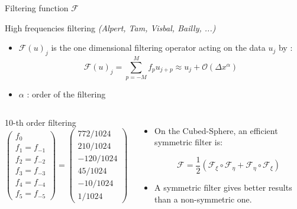 \documentclass[11pt]{beamer}
\begin{document}
\begin{frame}{Filtering function $\mathcal{F}$ }
\begin{block}{High frequencies filtering \textit{(Alpert, Tam, Visbal, Bailly, ...)}}
\begin{itemize}
\item $\mathcal{F}(u)_j$ is the one dimensional filtering operator acting on the data $u_j$ by :
$$
\mathcal{F}(u)_j = \sum_{p=-M}^M f_{p} u_{j+p}\approx u_j + \mathcal{O}\left( \Delta x^{\alpha} \right)
$$
\item $\alpha$ : order of the filtering
\end{itemize}
\end{block}
\begin{columns}
\begin{block}{10-th order filtering}
$\begin{pmatrix}
f_0\\ f_1 = f_{-1}\\ f_2 = f_{-2} \\ f_3=f_{-3} \\ f_4=f_{-4} \\ f_5 = f_{-5}
\end{pmatrix}=\begin{pmatrix}
772/1024\\ 210/1024\\ -120/1024\\ 45/1024\\ -10/1024\\ 1/1024
\end{pmatrix}$
\end{block}

\begin{itemize}
\item On the Cubed-Sphere, an efficient symmetric filter is:
\begin{block}{}
\begin{equation*}
\mathcal{F} = \dfrac{1}{2} \left( \mathcal{F}_{\xi} \circ \mathcal{F}_{\eta} + \mathcal{F}_{\eta} \circ \mathcal{F}_{\xi} \right)
\end{equation*}
\end{block}
\item A symmetric filter gives better results than a non-symmetric one.
\end{itemize}
\end{columns}
\end{frame}

\end{document}
